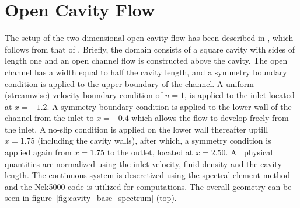 \section{Open Cavity Flow}
\label{sec:cavity_setup}

The setup of the two-dimensional open cavity flow has been described in \cite{negi24}, which follows from that of \cite{sipp07}. Briefly, the domain consists of a square cavity with sides of length one and an open channel flow is constructed above the cavity. The open channel has a width equal to half the cavity length, and a symmetry boundary condition is applied to the upper boundary of the channel. A uniform (streamwise) velocity boundary condition of $u=1$, is applied to the inlet located at $x=-1.2$. A symmetry boundary condition is applied to the lower wall of the channel from the inlet to $x = -0.4$ which allows the flow to develop freely from the inlet. A no-slip condition is applied on the lower wall thereafter uptill  $x = 1.75$ (including the cavity walls), after which, a symmetry condition is applied again from $x = 1.75$ to the outlet, located at $x = 2.50$. All physical quantities are normalized using the inlet velocity, fluid density and the cavity length. The continuous system is descretized using the spectral-element-method \citep{patera84} and the Nek5000 code \citep{nek5000} is utilized for computations. The overall geometry can be seen in figure~\ref{fig:cavity_base_spectrum} (top). 

